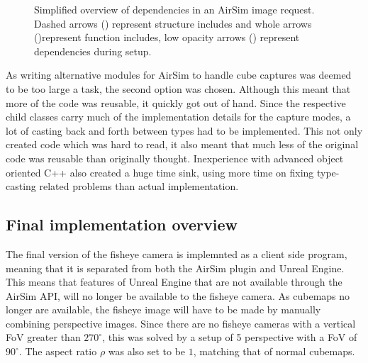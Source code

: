 \begin{figure}[!htb]
    \caption{Simplified overview of dependencies in an AirSim image request. Dashed arrows (\protect\drawdashedarrow) represent structure includes and whole arrows (\protect\drawarrow)represent function includes, low opacity arrows (\protect\drawopacitydarrow) represent dependencies during setup.}
    \label{fig:comm_pattern_camera_request}
\end{figure}

As writing alternative modules for AirSim to handle cube captures was deemed to be too large a task, the second option was chosen. Although this meant that more of the code was reusable, it quickly got out of hand. Since the respective child classes carry much of the implementation details for the capture modes, a lot of casting back and forth between types had to be implemented. This not only created code which was hard to read, it also meant that much less of the original code was reusable than originally thought. Inexperience with advanced object oriented C++ also created a huge time sink, using more time on fixing type-casting related problems than actual implementation.

\subsection{Final implementation overview} \label{subsec:Fisheye_impl_overview}

The final version of the fisheye camera is implemnted as a client side program, meaning that it is separated from both the AirSim plugin and Unreal Engine. This means that features of Unreal Engine that are not available through the AirSim API, will no longer be available to the fisheye camera. As cubemaps no longer are available, the fisheye image will have to be made by manually combining perspective images. Since there are no fisheye cameras with a vertical FoV greater than $270^\circ$, this was solved by a setup of 5 perspective with a FoV of $90^\circ$. The aspect ratio $\rho$ was also set to be $1$, matching that of normal cubemaps. 

